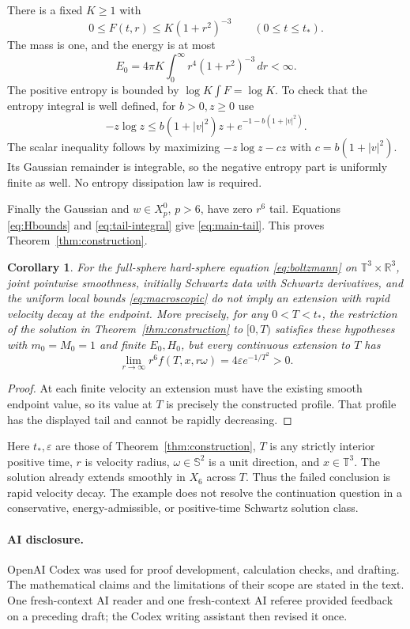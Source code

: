 \documentclass[11pt,a4paper]{article}
\numberwithin{equation}{section}
\newtheorem{corollary}[theorem]{Corollary}
\theoremstyle{remark}
\newcommand{\R}{\mathbb R}
\newcommand{\T}{\mathbb T}
\newcommand{\Sph}{\mathbb S}
\newcommand{\dd}{\,d}
\begin{document}
There is a fixed \(K\geq1\) with
\[
 0\leq F(t,r)\leq K(1+r^2)^{-3}\qquad(0\leq t\leq t_*).
\]
The mass is one, and the energy is at most
\[
 E_0=4\pi K\int_0^\infty r^4(1+r^2)^{-3}\dd r<\infty.
\]
The positive entropy is bounded by \(\log K\int F=\log K\).
To check that the entropy integral is well defined, for \(b>0,z\geq0\)
use
\[
 -z\log z\leq b(1+|v|^2)z+e^{-1-b(1+|v|^2)}.
\]
The scalar inequality follows by maximizing \(-z\log z-cz\) with
\(c=b(1+|v|^2)\). Its Gaussian remainder is integrable, so the negative
entropy part is uniformly finite as well. No entropy dissipation law
is required.

Finally the Gaussian and \(w\in X_p^0\), \(p>6\), have zero \(r^6\)
tail. Equations \eqref{eq:Hbounds} and \eqref{eq:tail-integral} give
\eqref{eq:main-tail}. This proves Theorem~\ref{thm:construction}.

\begin{corollary}\label{cor:literal}
For the full-sphere hard-sphere equation \eqref{eq:boltzmann} on
\(\T^3\times\R^3\), joint pointwise smoothness, initially Schwartz
data with Schwartz derivatives, and the uniform local bounds
\eqref{eq:macroscopic} do not imply an extension with rapid velocity
decay at the endpoint. More precisely, for any \(0<T<t_*\), the
restriction of the solution in Theorem~\ref{thm:construction} to
\([0,T)\) satisfies these hypotheses with \(m_0=M_0=1\) and finite
\(E_0,H_0\), but every continuous extension to \(T\) has
\[
 \lim_{r\to\infty}r^6f(T,x,r\omega)
       =4\varepsilon e^{-1/T^2}>0.
\]
\end{corollary}
\begin{proof}
At each finite velocity an extension must have the existing smooth
endpoint value, so its value at \(T\) is precisely the constructed
profile. That profile has the displayed tail and cannot be rapidly
decreasing.
\end{proof}

Here \(t_*,\varepsilon\) are those of Theorem~\ref{thm:construction},
\(T\) is any strictly interior positive time, \(r\) is velocity radius,
\(\omega\in\Sph^2\) is a unit direction, and \(x\in\T^3\).
The solution already extends smoothly in \(X_6\) across \(T\).
Thus the failed conclusion is rapid velocity decay. The example does
not resolve the continuation question in a conservative,
energy-admissible, or positive-time Schwartz solution class.

\paragraph{AI disclosure.}
OpenAI Codex was used for proof development, calculation checks, and
drafting. The mathematical claims and the limitations of their scope
are stated in the text. One fresh-context AI reader and one fresh-context
AI referee provided feedback on a preceding draft; the Codex writing
assistant then revised it once.
\end{document}
